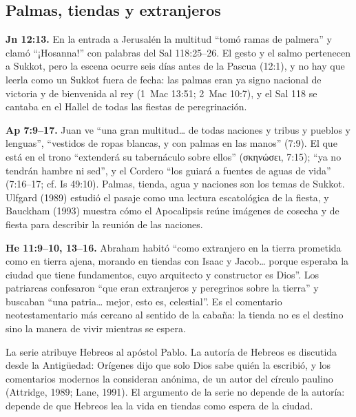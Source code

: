 \documentclass[11pt,letterpaper]{article}
\newcommand{\grc}[1]{\foreignlanguage{ancientgreek}{#1}}
\begin{document}
\subsection{Palmas, tiendas y extranjeros}
\textbf{Jn 12:13.} En la entrada a Jerusalén la multitud ``tomó ramas de palmera'' y clamó ``¡Hosanna!'' con palabras del Sal 118:25--26. El gesto y el salmo pertenecen a Sukkot, pero la escena ocurre seis días antes de la Pascua (12:1), y no hay que leerla como un Sukkot fuera de fecha: las palmas eran ya signo nacional de victoria y de bienvenida al rey (1~Mac 13:51; 2~Mac 10:7), y el Sal 118 se cantaba en el Hallel de todas las fiestas de peregrinación.

\textbf{Ap 7:9--17.} Juan ve ``una gran multitud\ldots{} de todas naciones y tribus y pueblos y lenguas'', ``vestidos de ropas blancas, y con palmas en las manos'' (7:9). El que está en el trono ``extenderá su tabernáculo sobre ellos'' (\grc{σκηνώσει}, 7:15); ``ya no tendrán hambre ni sed'', y el Cordero ``los guiará a fuentes de aguas de vida'' (7:16--17; cf. Is 49:10). Palmas, tienda, agua y naciones son los temas de Sukkot. Ulfgard (1989) estudió el pasaje como una lectura escatológica de la fiesta, y Bauckham (1993) muestra cómo el Apocalipsis reúne imágenes de cosecha y de fiesta para describir la reunión de las naciones.

\textbf{He 11:9--10, 13--16.} Abraham habitó ``como extranjero en la tierra prometida como en tierra ajena, morando en tiendas con Isaac y Jacob\ldots{} porque esperaba la ciudad que tiene fundamentos, cuyo arquitecto y constructor es Dios''. Los patriarcas confesaron ``que eran extranjeros y peregrinos sobre la tierra'' y buscaban ``una patria\ldots{} mejor, esto es, celestial''. Es el comentario neotestamentario más cercano al sentido de la cabaña: la tienda no es el destino sino la manera de vivir mientras se espera.

\begin{nota}[Precisión]
La serie atribuye Hebreos al apóstol Pablo. La autoría de Hebreos es discutida desde la Antigüedad: Orígenes dijo que solo Dios sabe quién la escribió, y los comentarios modernos la consideran anónima, de un autor del círculo paulino (Attridge, 1989; Lane, 1991). El argumento de la serie no depende de la autoría: depende de que Hebreos lea la vida en tiendas como espera de la ciudad.
\end{nota}
\end{document}
